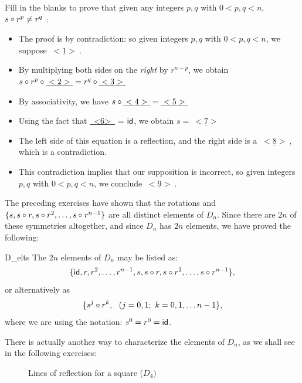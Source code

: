 \begin{exercise}{34}
Fill in the blanks to prove that given any integers $p,q$ with $0< p,q < n$, $s \circ r^p \neq r^q$ :
\begin{itemize}
\item
The proof is by contradiction: so given integers $p,q$ with $0< p,q < n$, we suppose $\underline{~<1>~}$.
\item
By multiplying both sides on the \emph{right} by $r^{n-p}$, we obtain $s \circ r^p \circ \underline{~<2>~} = r^q \circ \underline{~<3>~}$
\item
By associativity, we have $s \circ  \underline{~<4>~} =  \underline{~<5>~}$
\item
Using the fact that \underline{~<6>~} = ${\sf{i}d}$, we obtain $s = \underline{~<7>~}$
\item
The left side of this equation is a reflection, and the right side is a $\underline{~<8>~}$, which is a contradiction.
\item
This contradiction implies that our supposition is incorrect, so  given integers $p,q$ with $0< p,q < n$, we conclude $\underline{~<9>~}$.
\end{itemize}
\end{exercise}

The preceding exercises have shown that the rotations and $\{s, s \circ r, s \circ r^2,
\ldots, s \circ r^{n-1}\}$ are all distinct elements of $D_n$. Since there are $2n$ of these symmetries altogether, and since $D_n$ has  $2n$ elements, we have proved the following:

\begin{prop}{D_elts}
The $2n$ elements of $D_n$ may be listed as: 
\[\{ {\sf{i}d}, r, r^2, \ldots, r^{n-1},  s, s \circ r, s\circ r^2, \ldots, s \circ r^{n-1}\},\]
or alternatively  as
\[\{  s^j \circ r^k, ~~(j=0,1;~ k = 0,1,\ldots n-1 \},\]
where we are using the notation:  $s^0 = r^0 = {\sf{i}d}$.
\end{prop}

There is actually another way to characterize the elements of $D_n$, as we shall see in the following exercises:

 
\begin{figure}[hbt]
\begin{center}

\end{center}
\caption{Lines of reflection for a square ($D_4)$}
\label{D4}
\end{figure}


